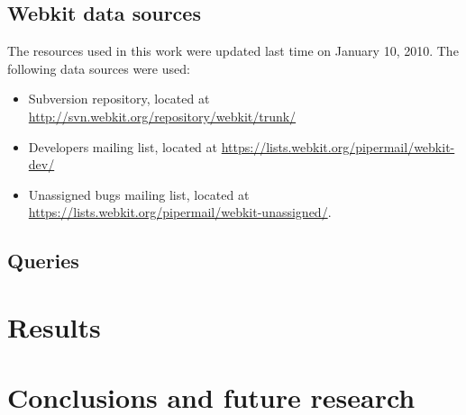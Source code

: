 \documentclass[12pt]{article}
\newcommand{\paginaenblanco}{\mbox{}\thispagestyle{empty}\newpage}
\begin{document}
\subsection{Webkit data sources}

The resources used in this work were updated last time on January 10, 2010. The following data sources were used: 
\begin{itemize}
\item Subversion repository, located at \url{http://svn.webkit.org/repository/webkit/trunk/}
\item Developers mailing list, located at \url{https://lists.webkit.org/pipermail/webkit-dev/}
\item Unassigned bugs mailing list, located at \url{https://lists.webkit.org/pipermail/webkit-unassigned/}.
\end{itemize}

\subsection{Queries}



\section{Results}



\section{Conclusions and future research}






\paginaenblanco


\end{document}
